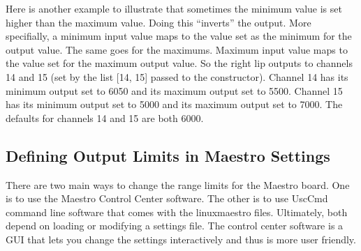 \documentclass[letterpaper,10pt,english]{sphinxmanual}
\begin{document}
\begin{sphinxVerbatim}[commandchars=\\\{\},numbers=left,firstnumber=117,stepnumber=1]
    \PYG{p}{[} \PYG{p}{]} \PYG{p}{[} \PYG{p}{]}
\PYG{p}{[} \PYG{p}{]} \PYG{p}{[} \PYG{p}{]} \PYG{p}{[} \PYG{p}{]}
\end{sphinxVerbatim}

\sphinxAtStartPar
Here is another example to illustrate that sometimes the minimum value is set higher
than the maximum value. Doing this “inverts” the output. More specifially, a minimum
input value maps to the value set as the minimum for the output value. The same goes
for the maximums. Maximum input value maps to the value set for the maximum output
value. So the right lip outputs to channels 14 and 15 (set by the list {[}14, 15{]}
passed to the constructor). Channel 14 has its minimum output set to 6050 and its
maximum output set to 5500. Channel 15 has its minimum output set to 5000 and its
maximum output set to 7000. The defaults for channels 14 and 15 are both 6000.


\subsection{Defining Output Limits in Maestro Settings}
\label{\detokenize{range:defining-output-limits-in-maestro-settings}}
\sphinxAtStartPar
{}

\sphinxAtStartPar
There are two main ways to change the range limits for the Maestro board. One is
to use the Maestro Control Center software. The other is to use UscCmd command
line software that comes with the linux\sphinxhyphen{}maestro files. Ultimately, both depend on
loading or modifying a settings file. The control center software is a GUI that
lets you change the settings interactively and thus is more user friendly.
\end{document}
